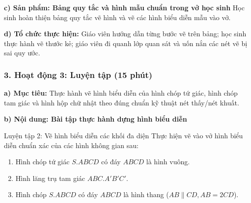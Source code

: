 \documentclass[12pt, a4paper]{article}
\begin{document}
\noindent \textbf{c) Sản phẩm: Bảng quy tắc và hình mẫu chuẩn trong vở học sinh}
Học sinh hoàn thiện bảng quy tắc vẽ hình và vẽ các hình biểu diễn mẫu vào vở.

\noindent \textbf{d) Tổ chức thực hiện:}
Giáo viên hướng dẫn từng bước vẽ trên bảng; học sinh thực hành vẽ thước kẻ; giáo viên đi quanh lớp quan sát và uốn nắn các nét vẽ bị sai quy ước.

\subsubsection*{3. Hoạt động 3: Luyện tập (15 phút)}

\noindent \textbf{a) Mục tiêu:}
Thực hành vẽ hình biểu diễn của hình chóp tứ giác, hình chóp tam giác và hình hộp chữ nhật theo đúng chuẩn kỹ thuật nét thấy/nét khuất.

\noindent \textbf{b) Nội dung: Bài tập thực hành dựng hình biểu diễn}
\begin{pedabox}{Luyện tập 2: Vẽ hình biểu diễn các khối đa diện}
Thực hiện vẽ vào vở hình biểu diễn chuẩn xác của các hình không gian sau:
\begin{enumerate}[leftmargin=0.6cm]
    \item Hình chóp tứ giác $S.ABCD$ có đáy $ABCD$ là hình vuông.
    \item Hình lăng trụ tam giác $ABC.A'B'C'$.
    \item Hình chóp $S.ABCD$ có đáy $ABCD$ là hình thang ($AB \parallel CD, AB = 2CD$).
\end{enumerate}
\end{pedabox}
\end{document}
